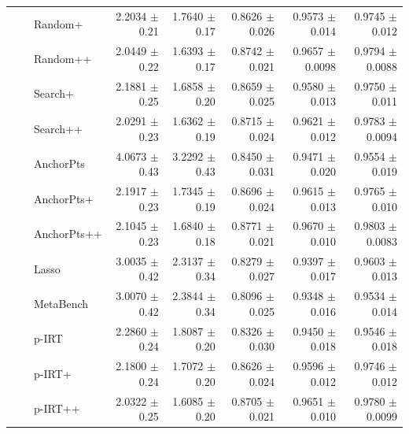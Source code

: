 \begin{longtable}{llp{}rrrrr}
 &  & Random+ & 2.2034 {\scriptsize $\pm$ 0.21} & 1.7640 {\scriptsize $\pm$ 0.17} & 0.8626 {\scriptsize $\pm$ 0.026} & 0.9573 {\scriptsize $\pm$ 0.014} & 0.9745 {\scriptsize $\pm$ 0.012} \\
 &  & Random++ & 2.0449 {\scriptsize $\pm$ 0.22} & 1.6393 {\scriptsize $\pm$ 0.17} & 0.8742 {\scriptsize $\pm$ 0.021} & 0.9657 {\scriptsize $\pm$ 0.0098} & 0.9794 {\scriptsize $\pm$ 0.0088} \\
 &  & Search+ & 2.1881 {\scriptsize $\pm$ 0.25} & 1.6858 {\scriptsize $\pm$ 0.20} & 0.8659 {\scriptsize $\pm$ 0.025} & 0.9580 {\scriptsize $\pm$ 0.013} & 0.9750 {\scriptsize $\pm$ 0.011} \\
 &  & Search++ & 2.0291 {\scriptsize $\pm$ 0.23} & 1.6362 {\scriptsize $\pm$ 0.19} & 0.8715 {\scriptsize $\pm$ 0.024} & 0.9621 {\scriptsize $\pm$ 0.012} & 0.9783 {\scriptsize $\pm$ 0.0094} \\
 &  & AnchorPts & 4.0673 {\scriptsize $\pm$ 0.43} & 3.2292 {\scriptsize $\pm$ 0.43} & 0.8450 {\scriptsize $\pm$ 0.031} & 0.9471 {\scriptsize $\pm$ 0.020} & 0.9554 {\scriptsize $\pm$ 0.019} \\
 &  & AnchorPts+ & 2.1917 {\scriptsize $\pm$ 0.23} & 1.7345 {\scriptsize $\pm$ 0.19} & 0.8696 {\scriptsize $\pm$ 0.024} & 0.9615 {\scriptsize $\pm$ 0.013} & 0.9765 {\scriptsize $\pm$ 0.010} \\
 &  & AnchorPts++ & 2.1045 {\scriptsize $\pm$ 0.23} & 1.6840 {\scriptsize $\pm$ 0.18} & 0.8771 {\scriptsize $\pm$ 0.021} & 0.9670 {\scriptsize $\pm$ 0.010} & 0.9803 {\scriptsize $\pm$ 0.0083} \\
 &  & Lasso & 3.0035 {\scriptsize $\pm$ 0.42} & 2.3137 {\scriptsize $\pm$ 0.34} & 0.8279 {\scriptsize $\pm$ 0.027} & 0.9397 {\scriptsize $\pm$ 0.017} & 0.9603 {\scriptsize $\pm$ 0.013} \\
 &  & MetaBench & 3.0070 {\scriptsize $\pm$ 0.42} & 2.3844 {\scriptsize $\pm$ 0.34} & 0.8096 {\scriptsize $\pm$ 0.025} & 0.9348 {\scriptsize $\pm$ 0.016} & 0.9534 {\scriptsize $\pm$ 0.014} \\
 &  & p-IRT & 2.2860 {\scriptsize $\pm$ 0.24} & 1.8087 {\scriptsize $\pm$ 0.20} & 0.8326 {\scriptsize $\pm$ 0.030} & 0.9450 {\scriptsize $\pm$ 0.018} & 0.9546 {\scriptsize $\pm$ 0.018} \\
 &  & p-IRT+ & 2.1800 {\scriptsize $\pm$ 0.24} & 1.7072 {\scriptsize $\pm$ 0.20} & 0.8626 {\scriptsize $\pm$ 0.024} & 0.9596 {\scriptsize $\pm$ 0.012} & 0.9746 {\scriptsize $\pm$ 0.012} \\
 &  & p-IRT++ & 2.0322 {\scriptsize $\pm$ 0.25} & 1.6085 {\scriptsize $\pm$ 0.20} & 0.8705 {\scriptsize $\pm$ 0.021} & 0.9651 {\scriptsize $\pm$ 0.010} & 0.9780 {\scriptsize $\pm$ 0.0099} \\

\end{longtable}

